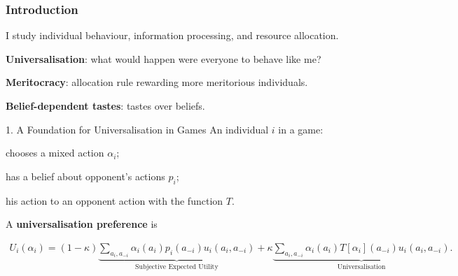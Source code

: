 \documentclass[usenames,dvipsnames,aspectratio=169,11pt,handout]{beamer}
\begin{document}
\begin{frame}
	\maketitle

\end{frame}

\begin{frame}\frametitle{Introduction}

	I study individual behaviour, information processing, and resource allocation. \pause

	\vfill

	\begin{wideenumerate}

		\item \textbf{Universalisation}: what would happen were everyone to behave like me?

		\citep{algerHomoMoralisPreference2013,laffontMacroeconomicConstraintsEconomic1975,kant1785grundlegung,roemer2019cooperate}
		\vfill \pause

		\item \textbf{Meritocracy}: allocation rule rewarding more meritorious individuals.

		\citep{cappelenFairUnfairIncome2020,fleurbaey2008fairness,kaganGeometryDesert2014,senMeritJustice2000} \pause
		\vfill

		\item \textbf{Belief-dependent tastes}: tastes over beliefs.

		\citep{benabou2016mindful,brunnermeierOptimalExpectations2005,golmanInformationAvoidance2017}
	\end{wideenumerate}


\end{frame}

\begin{frame}{1. A Foundation for Universalisation in Games}
	An individual \( i \) in a game:

	\vfill

	\begin{wideitemize}
		\item chooses a mixed action \( \alpha_i \);
		\item has a belief about opponent's actions \( p_i \);
		\item {} his action to an opponent action with the function \( T \).
	\end{wideitemize}

	\vfill

	A \textbf{universalisation preference} is

	\vfill

	\[
		\begin{aligned}
			U_i(\alpha_i) = (1-\kappa) \underbrace{\sum_{a_i, a_{-i}} \alpha_i(a_i) p_{i}(a_{-i}) u_i(a_i, a_{-i})}_{\text{Subjective Expected Utility}} + \kappa \underbrace{\sum_{a_i, a_{-i}} \alpha_i(a_i) T [ \alpha_i ](a_{-i}) u_i(a_i, a_{-i})}_{\text{Universalisation}} .
		\end{aligned}
	\]

\end{frame}
\end{document}
